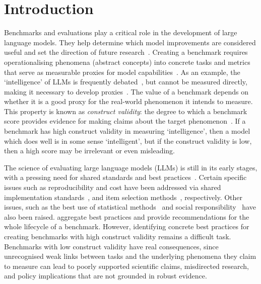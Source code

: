 \section{Introduction}
Benchmarks and evaluations play a critical role in the development of large language models. They help determine which model improvements are considered useful and set the direction of future research~\cite{dotanValueladenDisciplinaryShifts2019,hutchinsonEvaluationGapsMachine2022}. Creating a benchmark requires operationalising phenomena (abstract concepts) into concrete tasks and metrics that serve as measurable proxies for model capabilities~\cite{rajiAIEverythingWhole2021a}. As an example, the `intelligence' of LLMs is frequently debated~\cite{bubeckSparksArtificialGeneral2023, mccoyEmbersAutoregressionUnderstanding2023b}, but cannot be measured directly, making it necessary to develop proxies~\cite{hernandez-oralloMeasureAllMinds2017}. The value of a benchmark depends on whether it is a good proxy for the real-world phenomenon it intends to measure. This property is known as \textit{construct validity}: the degree to which a benchmark score provides evidence for making claims about the target phenomenon~\cite{bowmanWhatWillIt2021,rajiAIEverythingWhole2021a,cronbachConstructValidityPsychological1955}. If a benchmark has high construct validity in measuring `intelligence', then a model which does well is in some sense `intelligent', but if the construct validity is low, then a high score may be irrelevant or even misleading.

The science of evaluating large language models (LLMs) is still in its early stages, with a pressing need for shared standards and best practices~\cite{weidingerEvaluationScienceGenerative2025, bowmanWhatWillIt2021}. Certain specific issues such as reproducibility and cost have been addressed via shared implementation standards~\cite{bidermanLessonsTrenchesReproducible2024a,UK_AI_Security_Institute_Inspect_AI_Framework_2024}, and item selection methods~\cite{poloTinyBenchmarksEvaluatingLLMs2024a}, respectively. Other issues, such as the best use of statistical methods~\cite{mcintoshInadequaciesLargeLanguage2024, millerAddingErrorBars2024, luettgauHiBayESHierarchicalBayesian2025} and social responsibility~\cite{bowmanWhatWillIt2021, gebruDatasheetsDatasets2021} have also been raised. \textcite{reuelBetterBenchAssessingAI2024} aggregate best practices and provide recommendations for the whole lifecycle of a benchmark. However, identifying concrete best practices for creating benchmarks with high construct validity remains a difficult task. Benchmarks with low construct validity have real consequences, since unrecognised weak links between tasks and the underlying phenomena they claim to measure can lead to poorly supported scientific claims, misdirected research, and policy implications that are not grounded in robust evidence.

